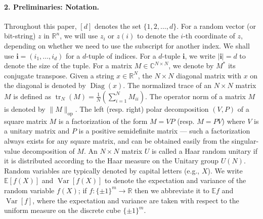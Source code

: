 \documentclass[10pt,a4paper]{article}
\begin{document}
\paragraph{2. Preliminaries: Notation.}
Throughout this paper, $[d]$ denotes the set $\{1,2,\ldots,d\}$. For a random vector (or bit-string) $z$ in $\mathbb R^n$, we will use $z_i$ or $z(i)$ to denote the $i$-th coordinate of $z$, depending on whether we need to use the subscript for another index. We shall use $\mathbf i=(i_1,\ldots,i_d)$ for a $d$-tuple of indices. For a $d$-tuple $\mathbf i$, we write $|\mathbf i|=d$ to denote the size of the tuple.
For a matrix $M\in\mathbb C^{N\times N}$, we denote by $M^*$ its conjugate transpose. Given a string $x\in\mathbb R^N$, the $N\times N$ diagonal matrix with $x$ on the diagonal is denoted by $\operatorname{Diag}(x)$. The normalized trace of an $N\times N$ matrix $M$ is defined as $\operatorname{tr}_N(M)=\frac1N(\sum_{i=1}^NM_{ii})$. The operator norm of a matrix $M$ is denoted by $\|M\|_{\mathrm{op}}$. The left (resp. right) polar decomposition $(V,P)$ of a square matrix $M$ is a factorization of the form $M=VP$ (resp. $M=PV$) where $V$ is a unitary matrix and $P$ is a positive semidefinite matrix --- such a factorization always exists for any square matrix, and can be obtained easily from the singular-value decomposition of $M$. An $N\times N$ matrix $U$ is called a Haar random unitary if it is distributed according to the Haar measure on the Unitary group $U(N)$.
Random variables are typically denoted by capital letters (e.g., $X$). We write $\mathbb E[f(X)]$ and $\operatorname{Var}[f(X)]$ to denote the expectation and variance of the random variable $f(X)$; if $f:\{\pm1\}^m\to\mathbb R$ then we abbreviate it to $\mathbb Ef$ and $\operatorname{Var}[f]$, where the expectation and variance are taken with respect to the uniform measure on the discrete cube $\{\pm1\}^m$.
\end{document}
